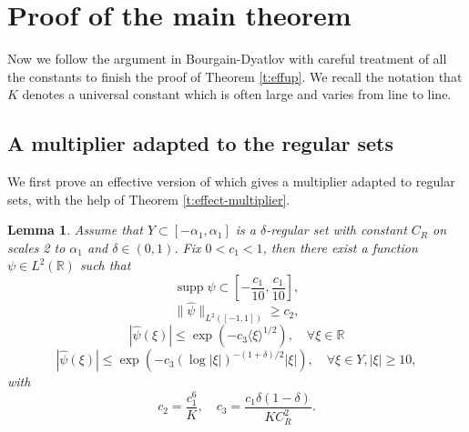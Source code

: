 \documentclass[reqno,12pt,letterpaper]{amsart}
\newtheorem{lem}[prop]{Lemma}
\numberwithin{equation}{section}
\numberwithin{prop}{section}
\DeclareMathOperator{\supp}{supp}
\begin{document}

\section{Proof of the main theorem}
\label{s:proof}


Now we follow the argument in Bourgain-Dyatlov \cite[Section 3]{fullgap} with careful treatment of all the constants to finish the proof of Theorem \ref{t:effup}. We recall the notation that $K$ denotes a universal constant which is often large and varies from line to line.


\subsection{A multiplier adapted to the regular sets}


We first prove an effective version of \cite[Lemma 3.1]{fullgap} which gives a multiplier adapted to regular sets, with the help of Theorem \ref{t:effect-multiplier}.

\begin{lem}
\label{p:adapt}
Assume that $Y\subset[-\alpha_1,\alpha_1]$ is a $\delta$-regular set with constant $C_R$ on scales 2 to $\alpha_1$ and $\delta\in(0,1)$. Fix $0<c_1<1$, then there exist a function $\psi\in L^2(\mathbb{R})$ such that
\begin{equation*}
\supp\psi\subset\left[-\frac{c_1}{10},\frac{c_1}{10}\right],
\end{equation*} 
\begin{equation*}
\|\widehat{\psi}\|_{L^2([-1,1])}\geq c_2,
\end{equation*}
\begin{equation*}
|\widehat{\psi}(\xi)|\leq\exp(-c_3\langle\xi\rangle^{1/2}),
\quad \forall\xi\in\mathbb{R}
\end{equation*}
\begin{equation*}
|\widehat{\psi}(\xi)|\leq\exp(-c_3(\log|\xi|)^{-(1+\delta)/2}|\xi|),
\quad \forall\xi\in Y, |\xi|\geq 10,
\end{equation*}
with
\begin{equation*}
c_2=\frac{c_1^6}{K},
\quad c_3=\frac{c_1\delta(1-\delta)}{KC_R^2}.
\end{equation*}
\end{lem}
\end{document}
